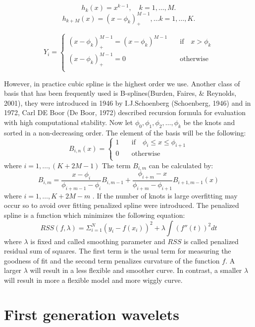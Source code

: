 \documentclass[12pt,twoside, a4paper]{reedthesis}
\begin{document}
\[h_k(x)=x^{k-1},\quad k=1,\dots,M.\]
\[h_{k+M}(x)=(x-\phi_k)^{M-1}_+,\dots k=1,\dots,K.\]

\[   
Y_i = 
     \begin{cases}
     (x-\phi_k)^{M-1}_+=     (x-\phi_k)^{M-1} & \quad\text{if}\quad x>\phi_k  \\
     (x-\phi_k)^{M-1}_+=0   & \quad \text{otherwise}\\
     \end{cases}
\]

However, in practice cubic spline is the highest order we use. Another class of basis that has been frequently used is B-splines(Burden, Faires, \& Reynolds, 2001), they were introduced in 1946 by I.J.Schoenberg (Schoenberg, 1946) and in 1972, Carl DE Boor (De Boor, 1972) described recursion formula for evaluation with high computational stability. Now let \(\phi_0,\phi_1,\phi_2,\dots,\phi_k\) be the knots and sorted in a non-decreasing order. The element of the basis will be the following:
\[B_{i,n}(x)= \begin{cases}
 1 & \quad\text{if}\quad \phi_i\leq x \leq \phi_{i+1}  \\
      0 & \quad\text{otherwise} \\
     \end{cases}\]
where \(i=1,\dots,(K+2M-1)\)
The term \(B_{i,m}\) can be calculated by:
\[B_{i,m}=\frac{x-\phi_i}{\phi_{i+m-1}-\phi_i}B_{i,m-1}+\frac{\phi_{i+m}-x}{\phi_{i+m}-\phi_{i+1}}B_{i+1,m-1}(x)\] where \(i=1,\dots,K+2M-m\)
. If the number of knots is large overfitting may occur so to avoid over fitting penalized spline were introduced. The penalized spline is a function which minimizes the following equation:
\begin{equation}
RSS(f,\lambda)=\Sigma^{N}_{i=1}(y_i-f(x_i))^2+\lambda\int(f''(t))^2dt
\label{eq:RSS}
\end{equation}
where \(\lambda\) is fixed and called smoothing parameter and \(RSS\) is called penalized residual sum of squares. The first term is the usual term for measuring the goodness of fit and the second term penalizes curvature of the function \(f\). A larger \(\lambda\) will result in a less flexible and smoother curve. In contrast, a smaller \(\lambda\) will result in more a flexible model and more wiggly curve.

\hypertarget{first-generation-wavelets}{%
\section{First generation wavelets}\label{first-generation-wavelets}}
\end{document}
